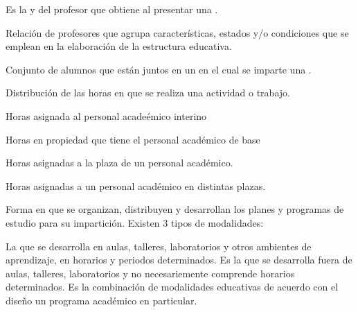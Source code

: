 \begin{bGlosario}
 	 Es la  y  del profesor que obtiene al presentar una .
 	
 	 Relación de profesores que agrupa características, estados y/o condiciones que se emplean en la elaboración de la estructura educativa.

	 Conjunto de alumnos que están juntos en un  en el cual se imparte una .
	
	 Distribución de las horas en que se realiza una actividad o trabajo.
	
	 Horas asignada al personal acadeémico interino\\
		\begin{Titemize}
			\Titem [Incidencia]
		\end{Titemize}
	
	 Horas en propiedad que tiene el personal académico de base
	
	 Horas asignadas a la plaza de un personal académico.
	
	 Horas asignadas a un personal académico en distintas plazas.
		
	 Forma en que se organizan, distribuyen y desarrollan los planes y programas de estudio para su impartición. Existen 3 tipos de modalidades:\\
	
	\begin{Titemize}
		\Titem [Escolarizada:] La que se desarrolla en aulas, talleres, laboratorios y otros ambientes de aprendizaje, en horarios y periodos determinados.
		\Titem [No Escolarizada:] Es la que se desarrolla fuera de aulas,
		talleres, laboratorios y no necesariemente comprende horarios determinados.
		\Titem [Mixta:] Es la combinación de modalidades educativas de
		acuerdo con el diseño un programa académico en particular.
	\end{Titemize}


\end{bGlosario}
